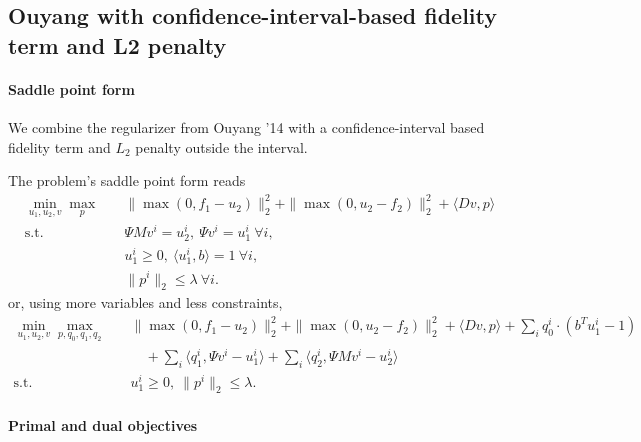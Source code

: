 
\subsection{Ouyang with confidence-interval-based fidelity term and L2 penalty}

\paragraph{Saddle point form}

We combine the regularizer from Ouyang '14 with a confidence-interval based
fidelity term and $L_2$ penalty outside the interval.

The problem's saddle point form reads
\begin{align*}
    \min_{u_1,u_2,v} \max_{p} \quad
        & \|\max(0, f_1 - u_2)\|_2^2 + \|\max(0, u_2 - f_2)\|_2^2
          + \langle Dv, p \rangle \\
    \text{s.t.}\quad 
        & \Psi M v^i = u_2^i, ~\Psi v^i = u_1^i ~\forall i, \\
        & u_1^i \geq 0, ~\langle u_1^i, b \rangle = 1 ~\forall i, \\
        & \|p^{i}\|_{2} \leq \lambda ~\forall i.
\end{align*}
or, using more variables and less constraints,
\begin{align*}
    \min_{u_1,u_2,v} \max_{p,q_0,q_1,q_2} \quad
        & \|\max(0, f_1 - u_2)\|_2^2 + \|\max(0, u_2 - f_2)\|_2^2
            + \langle Dv, p \rangle
            + \sum_{i} q_0^i \cdot (b^T u_1^i - 1) \\
        &\quad + \sum_{i} \langle q_1^i, \Psi v^i - u_1^i \rangle
            + \sum_{i} \langle q_2^i, \Psi M v^i - u_2^i \rangle \\
    \text{s.t.}\quad 
        & u_1^i \geq 0, ~\|p^{i}\|_{2} \leq \lambda.
\end{align*}

\paragraph{Primal and dual objectives}

